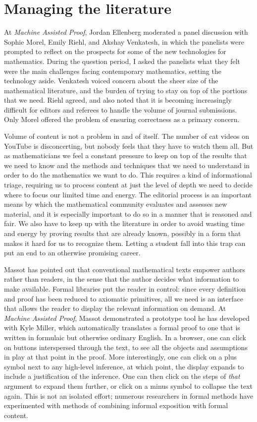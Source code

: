 \documentclass{amsart}
\theoremstyle{definition}
\theoremstyle{remark}
\numberwithin{equation}{section}
\begin{document}
\section{Managing the literature}

At \emph{Machine Assisted Proof}, Jordan Ellenberg moderated a panel discussion with Sophie Morel, Emily Riehl, and Akshay Venkatesh, in which the panelists were prompted to reflect on the prospects for some of the new technologies for mathematics. During the question period, I asked the panelists what they felt were the main challenges facing contemporary mathematics, setting the technology aside. Venkatesh voiced concern about the sheer size of the mathematical literature, and the burden of trying to stay on top of the portions that we need. Riehl agreed, and also noted that it is becoming increasingly difficult for editors and referees to handle the volume of journal submissions. Only Morel offered the problem of ensuring correctness as a primary concern.

Volume of content is not a problem in and of itself. The number of cat videos on YouTube is disconcerting, but nobody feels that they have to watch them all. But as mathematicians we feel a constant pressure to keep on top of the results that we need to know and the methods and techniques that we need to understand in order to do the mathematics we want to do. This requires a kind of informational triage, requiring us to process content at just the level of depth we need to decide where to focus our limited time and energy. The editorial process is an important means by which the mathematical community evaluates and assesses new material, and it is especially important to do so in a manner that is reasoned and fair. We also have to keep up with the literature in order to avoid wasting time and energy by proving results that are already known, possibly in a form that makes it hard for us to recognize them. Letting a student fall into this trap can put an end to an otherwise promising career.

Massot has pointed out that conventional mathematical texts empower authors rather than readers, in the sense that the author decides what information to make available. Formal libraries put the reader in control: since every definition and proof has been reduced to axiomatic primitives, all we need is an interface that allows the reader to display the relevant information on demand. At \emph{Machine Assisted Proof}, Massot demonstrated a prototype tool he has developed with Kyle Miller, which automatically translates a formal proof to one that is written in formulaic but otherwise ordinary English. In a browser, one can click on buttons interspersed through the text, to see all the objects and assumptions in play at that point in the proof. More interestingly, one can click on a plus symbol next to any high-level inference, at which point, the display expands to include a justification of the inference. One can then click on the steps of \emph{that} argument to expand them further, or click on a minus symbol to collapse the text again. This is not an isolated effort; numerous researchers in formal methods have experimented with methods of combining informal exposition with formal content.
\end{document}
